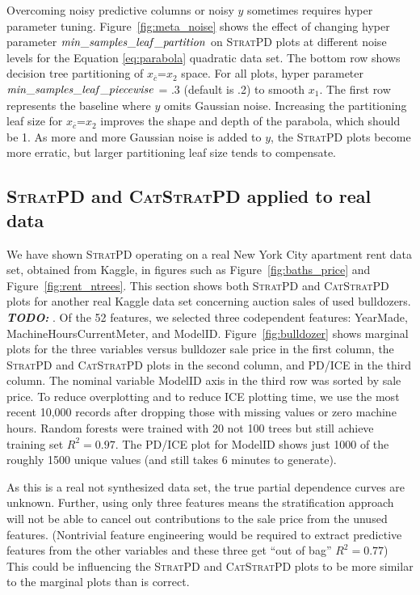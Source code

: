 \documentclass[12pt]{article}
\newcommand{\figref}[1]{Figure~\ref{#1}}
\newcommand{\todo}[1]{{\bf\em TODO:} {{\color{red}{#1}}}}
\newcommand{\spd}{\fontfamily{cmr}\textsc{\small StratPD}}
\newcommand{\cspd}{\fontfamily{cmr}\textsc{\small CatStratPD}}
\newcommand{\xnc}{$x_{\overline{c}}$}
\begin{document}
Overcoming noisy predictive columns or noisy $y$ sometimes requires hyper parameter tuning. \figref{fig:meta_noise} shows the effect of changing hyper parameter ${\it min\_samples\_leaf\_partition}$ on \spd{} plots at different noise levels for the Equation \eqref{eq:parabola} quadratic data set. The bottom row shows decision tree partitioning of \xnc{}=$x_2$ space. For all plots, hyper parameter ${\it min\_samples\_leaf\_piecewise}$ = .3 (default is .2) to smooth $x_1$. The first row represents the baseline where $y$ omits Gaussian noise.  Increasing the partitioning leaf size for \xnc{}=$x_2$ improves the shape and depth of the parabola, which should be 1.  As more and more Gaussian noise is added to $y$, the \spd{} plots become more erratic, but larger partitioning leaf size tends to compensate.

\subsection{\spd{} and \cspd{} applied to real data} 

We have shown \spd{} operating on a real New York City apartment rent data set, obtained from Kaggle, in figures such as \figref{fig:baths_price} and \figref{fig:rent_ntrees}.  This section shows both \spd{} and \cspd{} plots for another real Kaggle data set concerning auction sales of used bulldozers. \todo{cite data location}.  Of the 52 features, we selected three codependent features: YearMade, MachineHoursCurrentMeter, and ModelID. \figref{fig:bulldozer} shows marginal plots for the three variables versus bulldozer sale price in the first column, the \spd{} and \cspd{} plots in the second column, and PD/ICE in the third column. The nominal variable ModelID axis in the third row was sorted by sale price. To reduce overplotting and to reduce ICE plotting time, we use the most recent 10,000 records after dropping those with missing values or zero machine hours. Random forests were trained with 20 not 100 trees but still achieve training set $R^2=0.97$. The  PD/ICE plot for ModelID shows just 1000 of the roughly 1500 unique values (and still takes 6 minutes to generate).

As this is a real not synthesized data set, the true partial dependence curves are unknown. Further, using only three features means the stratification approach will not be able to cancel out contributions to the sale price from the unused features. (Nontrivial feature engineering would be required to extract predictive features from the other variables and these three get ``out of bag'' $R^2=0.77$) This could be influencing the \spd{} and \cspd{} plots to be more similar to the marginal plots than is correct.
\end{document}
